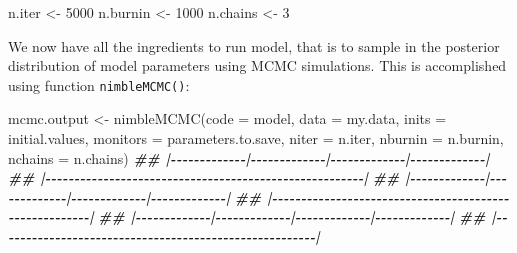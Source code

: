 \documentclass[
  12pt,
]{krantz}
\newenvironment{Shaded}{\begin{snugshade}}{\end{snugshade}}
\newcommand{\AttributeTok}[1]{\textcolor[rgb]{0.77,0.63,0.00}{#1}}
\newcommand{\DecValTok}[1]{\textcolor[rgb]{0.00,0.00,0.81}{#1}}
\newcommand{\DocumentationTok}[1]{\textcolor[rgb]{0.56,0.35,0.01}{\textbf{\textit{#1}}}}
\newcommand{\FunctionTok}[1]{\textcolor[rgb]{0.00,0.00,0.00}{#1}}
\newcommand{\NormalTok}[1]{#1}
\newcommand{\OtherTok}[1]{\textcolor[rgb]{0.56,0.35,0.01}{#1}}
\begin{document}
\begin{Shaded}
\begin{Highlighting}[]
\NormalTok{n.iter }\OtherTok{\textless{}{-}} \DecValTok{5000}
\NormalTok{n.burnin }\OtherTok{\textless{}{-}} \DecValTok{1000}
\NormalTok{n.chains }\OtherTok{\textless{}{-}} \DecValTok{3}
\end{Highlighting}
\end{Shaded}

We now have all the ingredients to run model, that is to sample in the posterior distribution of model parameters using MCMC simulations. This is accomplished using function \texttt{nimbleMCMC()}:

\begin{Shaded}
\begin{Highlighting}[]
\NormalTok{mcmc.output }\OtherTok{\textless{}{-}} \FunctionTok{nimbleMCMC}\NormalTok{(}\AttributeTok{code =}\NormalTok{ model,}
                          \AttributeTok{data =}\NormalTok{ my.data,}
                          \AttributeTok{inits =}\NormalTok{ initial.values,}
                          \AttributeTok{monitors =}\NormalTok{ parameters.to.save,}
                          \AttributeTok{niter =}\NormalTok{ n.iter,}
                          \AttributeTok{nburnin =}\NormalTok{ n.burnin,}
                          \AttributeTok{nchains =}\NormalTok{ n.chains)}
\DocumentationTok{\#\# |{-}{-}{-}{-}{-}{-}{-}{-}{-}{-}{-}{-}{-}|{-}{-}{-}{-}{-}{-}{-}{-}{-}{-}{-}{-}{-}|{-}{-}{-}{-}{-}{-}{-}{-}{-}{-}{-}{-}{-}|{-}{-}{-}{-}{-}{-}{-}{-}{-}{-}{-}{-}{-}|}
\DocumentationTok{\#\# |{-}{-}{-}{-}{-}{-}{-}{-}{-}{-}{-}{-}{-}{-}{-}{-}{-}{-}{-}{-}{-}{-}{-}{-}{-}{-}{-}{-}{-}{-}{-}{-}{-}{-}{-}{-}{-}{-}{-}{-}{-}{-}{-}{-}{-}{-}{-}{-}{-}{-}{-}{-}{-}{-}{-}|}
\DocumentationTok{\#\# |{-}{-}{-}{-}{-}{-}{-}{-}{-}{-}{-}{-}{-}|{-}{-}{-}{-}{-}{-}{-}{-}{-}{-}{-}{-}{-}|{-}{-}{-}{-}{-}{-}{-}{-}{-}{-}{-}{-}{-}|{-}{-}{-}{-}{-}{-}{-}{-}{-}{-}{-}{-}{-}|}
\DocumentationTok{\#\# |{-}{-}{-}{-}{-}{-}{-}{-}{-}{-}{-}{-}{-}{-}{-}{-}{-}{-}{-}{-}{-}{-}{-}{-}{-}{-}{-}{-}{-}{-}{-}{-}{-}{-}{-}{-}{-}{-}{-}{-}{-}{-}{-}{-}{-}{-}{-}{-}{-}{-}{-}{-}{-}{-}{-}|}
\DocumentationTok{\#\# |{-}{-}{-}{-}{-}{-}{-}{-}{-}{-}{-}{-}{-}|{-}{-}{-}{-}{-}{-}{-}{-}{-}{-}{-}{-}{-}|{-}{-}{-}{-}{-}{-}{-}{-}{-}{-}{-}{-}{-}|{-}{-}{-}{-}{-}{-}{-}{-}{-}{-}{-}{-}{-}|}
\DocumentationTok{\#\# |{-}{-}{-}{-}{-}{-}{-}{-}{-}{-}{-}{-}{-}{-}{-}{-}{-}{-}{-}{-}{-}{-}{-}{-}{-}{-}{-}{-}{-}{-}{-}{-}{-}{-}{-}{-}{-}{-}{-}{-}{-}{-}{-}{-}{-}{-}{-}{-}{-}{-}{-}{-}{-}{-}{-}|}
\end{Highlighting}
\end{Shaded}
\end{document}
